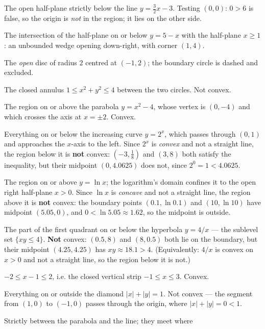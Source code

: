 \begin{solutions}
  \item The open half-plane strictly below the line $y=\tfrac32x-3$.
        Testing $(0,0)$: $0>6$ is false, so the origin is \emph{not} in the
        region; it lies on the other side.
  \item The intersection of the half-plane on or below $y=5-x$ with the
        half-plane $x\ge1$: an unbounded wedge opening down-right, with
        corner $(1,4)$.
  \item The \emph{open} disc of radius $2$ centred at $(-1,2)$; the
        boundary circle is dashed and excluded.
  \item The closed annulus $1\le x^{2}+y^{2}\le4$ between the two circles.
        Not convex.
  \item The region on or above the parabola $y=x^{2}-4$, whose vertex is
        $(0,-4)$ and which crosses the axis at $x=\pm2$. Convex.
  \item Everything on or below the increasing curve $y=2^{x}$, which
        passes through $(0,1)$ and approaches the $x$-axis to the left. Since
        $2^{x}$ is \emph{convex} and not a straight line, the region below
        it is \textbf{not} convex: $(-3,\tfrac18)$ and $(3,8)$ both satisfy the inequality,
        but their midpoint $(0,4.0625)$ does not, since $2^{0}=1<4.0625$.
  \item The region on or above $y=\ln x$; the logarithm's domain confines
        it to the open right half-plane $x>0$. Since $\ln x$ is
        \emph{concave} and not a straight line, the region above it is
        \textbf{not} convex: the
        boundary points $(0.1,\ln 0.1)$ and $(10,\ln 10)$ have midpoint
        $(5.05,0)$, and $0<\ln 5.05\approx1.62$, so the midpoint is
        outside.
  \item The part of the first quadrant on or below the hyperbola $y=4/x$
        --- the sublevel set $\{xy\le4\}$. \textbf{Not} convex: $(0.5,8)$
        and $(8,0.5)$ both lie on the boundary, but their midpoint
        $(4.25,4.25)$ has $xy\approx18.1>4$. (Equivalently: $4/x$ is convex
        on $x>0$ and not a straight line, so the region below it is not.)
  \item $-2\le x-1\le2$, i.e. the closed vertical strip $-1\le x\le3$.
        Convex.
  \item Everything on or outside the diamond $|x|+|y|=1$. Not convex ---
        the segment from $(1,0)$ to $(-1,0)$ passes through the origin,
        where $|x|+|y|=0<1$.
  \item Strictly between the parabola and the line; they meet where

\end{solutions}
